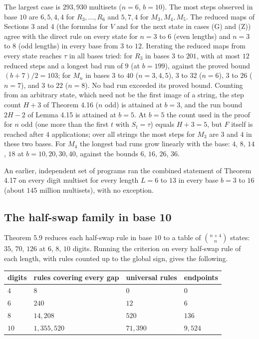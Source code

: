 \documentclass[11pt,letterpaper]{article}
\theoremstyle{paperstyle}
\theoremstyle{paperstyledef}
\theoremstyle{paperstylerem}
\begin{document}
The largest case is \(293{,}930\) multisets (\(n = 6\), \(b = 10\)). The most steps observed in base \(10\) are \(6, 5, 4, 4\) for \(R_3, \dots, R_6\) and \(5, 7, 4\) for \(M_3, M_4, M_5\). The reduced maps of Sections 3 and 4 (the formulas for \(V\) and for the next state in cases (G) and (Z)) agree with the direct rule on every state for \(n = 3\) to \(6\) (even lengths) and \(n = 3\) to \(8\) (odd lengths) in every base from \(3\) to \(12\). Iterating the reduced maps from every state reaches \(\tau\) in all bases tried: for \(R_3\) in bases \(3\) to \(201\), with at most \(12\) reduced steps and a longest bad run of \(9\) (at \(b = 199\)), against the proved bound \((b+7)/2 = 103\); for \(M_n\) in bases \(3\) to \(40\) (\(n = 3, 4, 5\)), \(3\) to \(32\) (\(n = 6\)), \(3\) to \(26\) (\(n = 7\)), and \(3\) to \(22\) (\(n = 8\)). No bad run exceeded its proved bound. Counting from an arbitrary state, which need not be the first image of a string, the step count \(H + 3\) of Theorem 4.16 (\(n\) odd) is attained at \(b = 3\), and the run bound \(2H - 2\) of Lemma 4.15 is attained at \(b = 5\). At \(b = 5\) the count used in the proof for \(n\) odd (one more than the first \(t\) with \(S_t = \tau\)) equals \(H + 3 = 5\), but \(F\) itself is reached after \(4\) applications; over all strings the most steps for \(M_3\) are \(3\) and \(4\) in these two bases. For \(M_4\) the longest bad runs grow linearly with the base: \(4\), \(8\), \(14\), \(18\) at \(b = 10, 20, 30, 40\), against the bounds \(6\), \(16\), \(26\), \(36\).

An earlier, independent set of programs ran the combined statement of Theorem 4.17 on every digit multiset for every length \(L = 6\) to \(13\) in every base \(b = 3\) to \(16\) (about \(145\) million multisets), with no exception.

\subsection{The half-swap family in base 10}\label{the-half-swap-family-in-base-10}

Theorem 5.9 reduces each half-swap rule in base \(10\) to a table of \(\binom{n+4}{n}\) states: \(35\), \(70\), \(126\) at \(6\), \(8\), \(10\) digits. Running the criterion on every half-swap rule of each length, with rules counted up to the global sign, gives the following.

{\def\LTcaptype{none} %
\begin{longtable}[]{@{}llll@{}}
\toprule\noalign{}
digits & rules covering every gap & universal rules & endpoints \\
\midrule\noalign{}
\endhead
\bottomrule\noalign{}
\endlastfoot
\(4\) & \(8\) & \(0\) & \(0\) \\
\(6\) & \(240\) & \(12\) & \(6\) \\
\(8\) & \(14{,}208\) & \(520\) & \(136\) \\
\(10\) & \(1{,}355{,}520\) & \(71{,}390\) & \(9{,}524\) \\
\end{longtable}
}
\end{document}
